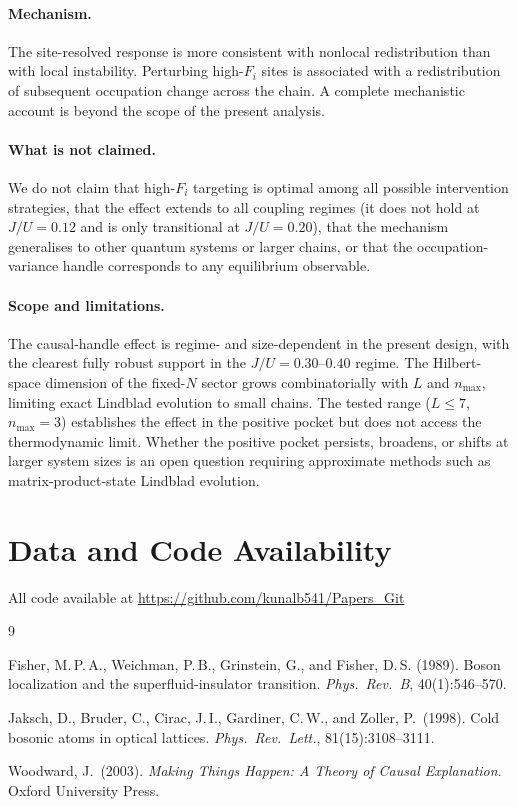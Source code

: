 \documentclass[11pt,a4paper]{article}
\newcommand{\Fi}{F_i}
\begin{document}
\paragraph{Mechanism.}
The site-resolved response is more consistent with nonlocal redistribution
than with local instability.
Perturbing high-$\Fi$ sites is associated with a redistribution of
subsequent occupation change across the chain.
A complete mechanistic account is beyond the scope of the present analysis.

\paragraph{What is not claimed.}
We do not claim that high-$\Fi$ targeting is optimal among all possible
intervention strategies, that the effect extends to all coupling regimes
(it does not hold at $J/U=0.12$ and is only transitional at $J/U=0.20$),
that the mechanism generalises to other quantum systems or larger chains,
or that the occupation-variance handle corresponds to any equilibrium
observable.

\paragraph{Scope and limitations.}
The causal-handle effect is regime- and size-dependent in the present
design, with the clearest fully robust support in the
$J/U=0.30$--$0.40$ regime.
The Hilbert-space dimension of the fixed-$N$ sector grows combinatorially
with $L$ and $n_{\max}$, limiting exact Lindblad evolution to small chains.
The tested range ($L\leq7$, $n_{\max}=3$) establishes the effect in the
positive pocket but does not access the thermodynamic limit.
Whether the positive pocket persists, broadens, or shifts at larger system
sizes is an open question requiring approximate methods such as
matrix-product-state Lindblad evolution.

\section*{Data and Code Availability}

All code available at \url{https://github.com/kunalb541/Papers_Git}


\begin{thebibliography}{9}

Fisher, M.\,P.\,A., Weichman, P.\,B., Grinstein, G., and Fisher, D.\,S.
(1989).
Boson localization and the superfluid-insulator transition.
\textit{Phys.\ Rev.\ B}, 40(1):546--570.

Jaksch, D., Bruder, C., Cirac, J.\,I., Gardiner, C.\,W., and Zoller, P.\
(1998).
Cold bosonic atoms in optical lattices.
\textit{Phys.\ Rev.\ Lett.}, 81(15):3108--3111.

Woodward, J.\ (2003).
\textit{Making Things Happen: A Theory of Causal Explanation}.
Oxford University Press.

\end{thebibliography}
\end{document}
